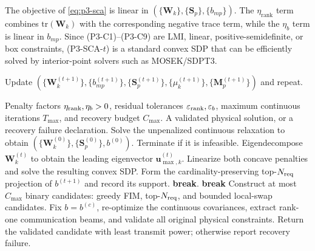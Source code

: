 \documentclass[12pt,a4paper]{article}
\newcommand{\vect}[1]{\mathbf{#1}}
\newcommand{\mat}[1]{\mathbf{#1}}
\newcommand{\tr}{\text{tr}}
\begin{document}
The objective of \eqref{eq:p3-sca} is linear in $(\{\mat{W}_k\}, \{\mat{S}_p\}, \{b_{mp}\})$. The $\eta_{\text{rank}}$ term combines $\tr(\mat{W}_k)$ with the corresponding negative trace term, while the $\eta_b$ term is linear in $b_{mp}$. Since (P3-C1)--(P3-C9) are LMI, linear, positive-semidefinite, or box constraints, (P3-SCA-$t$) is a standard convex SDP that can be efficiently solved by interior-point solvers such as MOSEK/SDPT3.

Update $(\{\mat{W}_k^{(t+1)}\}, \{b_{mp}^{(t+1)}\}, \{\mat{S}_p^{(t+1)}\}, \{\mu_k^{(t+1)}\}, \{\mat{M}_p^{(t+1)}\})$ and repeat.

\begin{algorithm}[htbp]
\caption{Dual DC-SCA With Verified Binary Recovery}
\label{alg:sca-joint}
\begin{algorithmic}[1]
\Require Penalty factors $\eta_{\rm rank},\eta_b>0$, residual tolerances $\varepsilon_{\rm rank},\varepsilon_b$, maximum continuous iterations $T_{\max}$, and recovery budget $C_{\max}$.
\Ensure A validated physical solution, or a recovery failure declaration.
\State Solve the unpenalized continuous relaxation to obtain $(\{\mat{W}_k^{(0)}\},\{\mat{S}_p^{(0)}\},b^{(0)})$. Terminate if it is infeasible.
        \State Eigendecompose $\mat{W}_k^{(t)}$ to obtain the leading eigenvector $\vect{u}_{\max,k}^{(t)}$.
    \EndFor
    \State Linearize both concave penalties and solve the resulting convex SDP.
    \State Form the cardinality-preserving top-$N_{\rm req}$ projection of $b^{(t+1)}$ and record its support.
    \If{$\sum_k\rho(\mat{W}_k^{(t+1)})\leq\varepsilon_{\rm rank}$ and $\max_{m,p}\min\{b_{mp}^{(t+1)},1-b_{mp}^{(t+1)}\}\leq\varepsilon_b$}
        \State \textbf{break}.
    \EndIf
        \State \textbf{break} 
    \EndIf
\EndFor
\State Construct at most $C_{\max}$ binary candidates: greedy FIM, top-$N_{\rm req}$, and bounded local-swap candidates.
    \State Fix $b=b^{(c)}$, re-optimize the continuous covariances, extract rank-one communication beams, and validate all original physical constraints.
\EndFor
\State Return the validated candidate with least transmit power; otherwise report recovery failure.
\end{algorithmic}
\end{algorithm}
\end{document}
